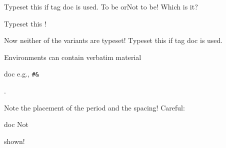 \documentclass{article}
\begin{document}
   {Typeset this if tag doc is used.}
  {To be or}{Not to be!}  Which is it?   \par
{}
Typeset this !     \par
{} 
Now neither of the variants are typeset!
   {Typeset this if tag doc is used.}

Environments can contain verbatim material
\begin{taggedblock}{doc}
e.g.,
\verb=#&=\end{taggedblock}
.

Note the placement of the period and the spacing!
Careful:
\begin{untaggedblock}{doc}
Not
\end{untaggedblock}
shown!
\end{document}
